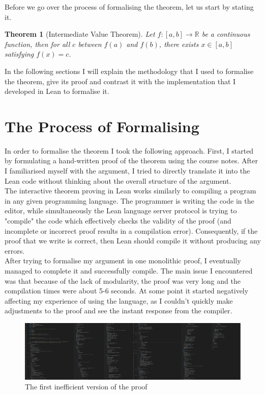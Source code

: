 \documentclass[11pt]{article}
\newcommand\R{\mathbb{R}}
\newtheorem*{theorem}{Theorem}
\begin{document}
Before we go over the process of formalising the theorem, let us start by
stating it.
\begin{theorem}[Intermediate Value Theorem]
  Let $f : [a, b] \to \R  $ be a continuous function, then for all $c$ between
  $f(a)$ and $f(b)$, there exists $x \in [a, b] $ satisfying $f(x) = c$.
\end{theorem}

In the following sections I will explain the methodology that I used to
formalise the theorem, give its proof and contrast it with the implementation
that I developed in Lean to formalise it.


\section*{ The Process of Formalising }

In order to formalise the theorem I took the following approach. First, I
started by formulating a hand-written proof of the theorem using the course
notes. After I familiarised myself with the argument, I tried to directly
translate it into the Lean code without thinking about the overall structure of
the argument. \\

The interactive theorem proving in Lean works similarly to
compiling a program in any given programming language. The programmer is writing
the code in the editor, while simultaneously the Lean language server protocol
is trying to "compile" the code which effectively checks the validity of the
proof (and incomplete or incorrect proof results in a compilation error).
Consequently, if the proof that we write is correct, then Lean should compile
it without producing any errors.\\

After trying to formalise my argument in one monolithic proof, I eventually
managed to complete it and successfully compile. The main issue I
encountered was that because of the lack of modularity, the proof was very long
and the compilation times were about 5-6 seconds. At some point it started
negatively affecting my experience of using the language, as I couldn't quickly
make adjustments to the proof and see the instant response from the compiler.


\begin{figure}[H]
  \centering
  \includegraphics[scale=1.1]{long_code.png}
  \caption{The first inefficient version of the proof}
	\label{long_code}

\end{figure}
\end{document}
